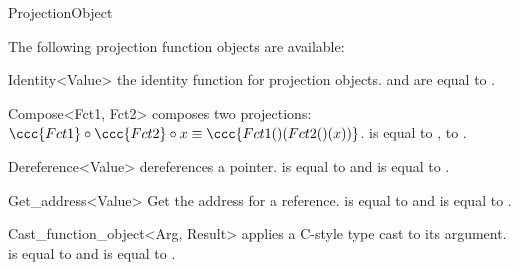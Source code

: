 
\ccOperations

\ccHtmlNoClassFile
\ccHtmlNoClassLinks
\begin{ccClass}{ProjectionObject}
\ccTagFullDeclarations
{}
\ccGlue
{}
\ccTagDefaults
\end{ccClass}

\ccCreation

The following projection function objects are available:


\ccHtmlNoClassFile
\begin{ccClassTemplate}{Identity<Value>}
    {the identity function for projection objects. 
       and  are equal to .}
\end{ccClassTemplate}

\ccHtmlNoClassFile
\begin{ccClassTemplate}{Compose<Fct1, Fct2>}
    {composes two projections: $\ccc{Fct1} \circ
      \ccc{Fct2} \circ x \equiv \ccc{Fct1()( Fct2()(x))}$.
       is equal to ,
       to .}
\end{ccClassTemplate}

\ccHtmlNoClassFile
\begin{ccClassTemplate}{Dereference<Value>}
    {dereferences a pointer.
       is equal to  and 
       is equal to .}
\end{ccClassTemplate}

\ccHtmlNoClassFile
\begin{ccClassTemplate}{Get_address<Value>}
    {Get the address for a reference.
       is equal to  and 
       is equal to .}
\end{ccClassTemplate}

\ccHtmlNoClassFile
\begin{ccClassTemplate}{Cast_function_object<Arg, Result>}
    {applies a C-style type cast to its argument. 
       is equal to  and 
       is equal to .}
\end{ccClassTemplate}

